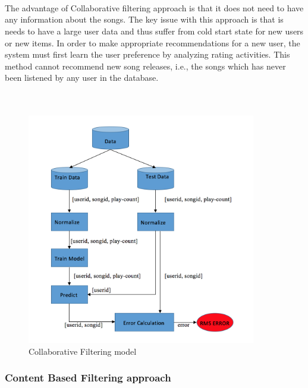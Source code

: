 \documentclass{sig-alternate-05-2015}
\begin{document}
\\\\\\
The advantage of Collaborative filtering approach is that it does not need to have any information about the songs. The key issue with this approach is that is needs to have a large user data and thus suffer from cold start state for new users or new items. In order to make appropriate recommendations for a new user, the system must first learn the user preference by analyzing rating activities. This method cannot recommend new song releases, i.e., the songs which has never been listened by any user in the database.\\\\\\
\begin{figure}[h]
    \centering
    \includegraphics [width =10cm]{Images/SystemStructure.png}
    \caption{Collaborative Filtering model }
\end{figure}


\subsubsection{Content Based Filtering approach}
\end{document}
